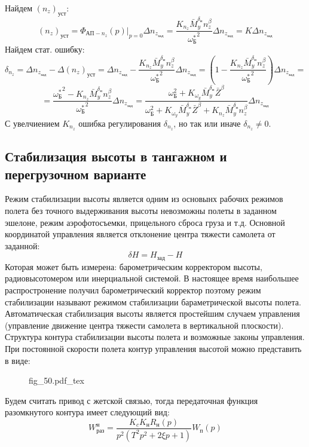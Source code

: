 \documentclass{article}
\newcommand{\incfig}[1]{
    {#1.pdf_tex}
}
\begin{document}
Найдем $(n_z)_\text{уст}$:
\[
	(n_z)_\text{уст} = \Phi_{\text{АП}-n_z}(p) |_{p=0} \Delta n_{z_\text{зад}} =\frac{K_{n_z} \bar{M}_y^{\delta_\text{н}} n_z^\beta}{{\omega_\text{Б}^*}^2} \Delta n_{z_\text{зад}} = K \Delta n_{z_\text{зад}}
\]
Найдем стат. ошибку:
\[
	\delta_{n_z} = \Delta n_{z_\text{зад}} - \Delta (n_z)_\text{уст} = \Delta n_{z_\text{зад}} - \frac{K_{n_z} \bar{M}_y^{\delta_\text{н}}n_z^\beta}{{\omega_\text{Б}^*}^2} \Delta n_{z_\text{зад}} = \left( 1 - \frac{ K_{n_z} \bar{M}_y^{\delta_\text{н}} n_z^\beta}{{\omega_\text{Б}^*}^2} \right) \Delta n_{z_\text{зад}} = 
\]
\[
	= \frac{{\omega_\text{Б}^*}^2 - K_{n_z} \bar{M}_y^{\delta_\text{н}} n_z^\beta}{ {\omega_\text{Б}^*}^2} \Delta n_{z_\text{зад}} = \frac{\omega_\text{Б}^2 + K_{\omega_y} \bar{M}_y^{\delta_\text{н}} \bar{Z}^\beta}{\omega_\text{Б}^2 + K_{\omega_y} \bar{M}_y^{\delta_\text{н}} \bar{Z}^\beta + K_{n_z} \bar{M}_y^{\delta_\text{н}} n_z^\beta} \Delta n_{z_\text{зад}}
\]
С увелчиением $K_{n_z}$ ошибка регулирования $\delta_{n_z}$, но так или иначе $\delta_{n_z} \neq 0$.

\subsection{Стабилизация высоты в тангажном и перегрузочном варианте}
Режим стабилизации высоты является одним из основынх рабочих режимов полета без точного выдерживания высоты невозможны полеты в заданном эшелоне, режим аэрофотосъемки, прицельного сброса груза и т.д. Основной координатой управления является отклонение центра тяжести самолета от заданной:
\[
	\delta H = H_\text{зад} - H
\]
Которая может быть измерена: барометрическим корректором высоты, радиовысотомером или инерциальной системой. В настоящее время наибольшее распростронение получил барометрический корректор поэтому режим стабилизации называют режимом стабилизации бараметрической высоты полета. Автоматическая стабилизация высоты является простейшим случаем управления (управление движение центра тяжести самолета в вертикальной плоскости). Структура контура стабилизации высоты полета и возможные законы управления. При постоянной скорости полета контур управления высотой можно представить в виде:

\begin{figure}[H]
	\centering
	\incfig{fig_50}
	\label{fig:fig_50}
\end{figure}

Будем считать привод с жетской связью, тогда передаточная функция разомкнутого контура имеет следующий вид:
\[
	W_\text{раз}^\text{н} =\frac{K_c K_\text{н} R_\text{н}(p)}{p^2(T^2 p^2 + 2 \xi p + 1)}W_\text{п}(p)
\]
\end{document}
